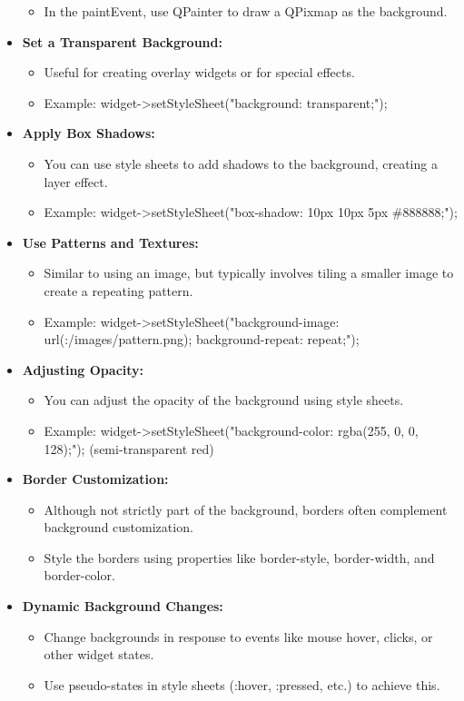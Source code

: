 \documentclass{report}
\begin{document}
\begin{itemize}
\begin{itemize}
                \item In the paintEvent, use QPainter to draw a QPixmap as the background.
        \end{itemize}
        \item \textbf{Set a Transparent Background:}
            \begin{itemize}
                \item Useful for creating overlay widgets or for special effects.
                \item Example: widget->setStyleSheet("background: transparent;");
            \end{itemize}
        \item \textbf{Apply Box Shadows:}
            \begin{itemize}
                \item You can use style sheets to add shadows to the background, creating a layer effect.
                \item Example: widget->setStyleSheet("box-shadow: 10px 10px 5px \#888888;");
            \end{itemize}
        \item \textbf{Use Patterns and Textures:}
            \begin{itemize}
                \item Similar to using an image, but typically involves tiling a smaller image to create a repeating pattern.
                \item Example: widget->setStyleSheet("background-image: url(:/images/pattern.png); background-repeat: repeat;");
            \end{itemize}
        \item \textbf{Adjusting Opacity:}
            \begin{itemize}
                \item You can adjust the opacity of the background using style sheets.
                \item Example: widget->setStyleSheet("background-color: rgba(255, 0, 0, 128);"); (semi-transparent red)
            \end{itemize}
        \item \textbf{Border Customization:}
            \begin{itemize}
                \item Although not strictly part of the background, borders often complement background customization.
                \item Style the borders using properties like border-style, border-width, and border-color.
            \end{itemize}
        \item \textbf{Dynamic Background Changes:}
            \begin{itemize}
                \item  Change backgrounds in response to events like mouse hover, clicks, or other widget states.
                \item Use pseudo-states in style sheets (:hover, :pressed, etc.) to achieve this.
           \end{itemize}
    \end{itemize}
\end{document}
